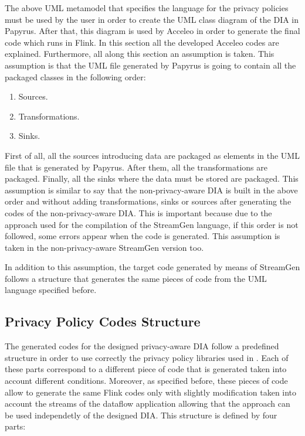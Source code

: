 The above UML metamodel that specifies the language for the privacy policies must be used by the user in order to create the UML class diagram of the DIA in Papyrus. After that, this diagram is used by Acceleo in order to generate the final code which runs in Flink. In this section all the developed Acceleo codes are explained. Furthermore, all along this section an assumption is taken. This assumption is that the UML file generated by Papyrus is going to contain all the packaged classes in the following order:

\begin{enumerate}
\item Sources.
\item Transformations.
\item Sinks.
\end{enumerate}

First of all, all the sources introducing data are packaged as elements in the UML file that is generated by Papyrus. After them, all the transformations are packaged. Finally, all the sinks where the data must be stored are packaged. This assumption is similar to say that the non-privacy-aware DIA is built in the above order and without adding transformations, sinks or sources after generating the codes of the non-privacy-aware DIA. This is important because due to the approach used for the compilation of the StreamGen language, if this order is not followed, some errors appear when the code is generated. This assumption is taken in the non-privacy-aware StreamGen version too.

In addition to this assumption, the target code generated by means of StreamGen follows a structure that generates the same pieces of code from the UML language specified before.

\subsection{Privacy Policy Codes Structure}

The generated codes for the designed privacy-aware DIA follow a predefined structure in order to use correctly the privacy policy libraries used in \cite{privacypoliciesarticle}. Each of these parts correspond to a different piece of code that is generated taken into account different conditions. Moreover, as specified before, these pieces of code allow to generate the same Flink codes only with slightly modification taken into account the streams of the dataflow application allowing that the approach can be used independetly of the designed DIA. This structure is defined by four parts:

